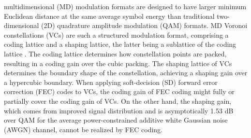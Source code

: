 \documentclass[journal]{IEEEtran}
\begin{document}

 multidimensional (MD) modulation formats are designed to have larger minimum Euclidean distance at the same average symbol energy than traditional two-dimensional (2D) quadrature amplitude modulation (QAM) formats. MD Voronoi constellations (VCs) are such a structured modulation format, comprising a coding lattice and a shaping lattice, the latter being a sublattice of the coding lattice \cite{conway83,forney89b}. The coding lattice determines 
how constellation points are packed, resulting in a coding gain over the cubic packing. The shaping lattice of VCs determines the boundary shape of the constellation, achieving a shaping gain over a hypercubic boundary. When applying soft-decision (SD) forward error correction (FEC) codes to VCs, the coding gain of FEC coding might fully or partially cover the coding gain of VCs. On the other hand, the shaping gain, which comes from improved signal distribution and is asymptotically 1.53 dB over QAM for the average power-constrained additive white Gaussian noise (AWGN) channel, cannot be realized by FEC coding.
\end{document}
